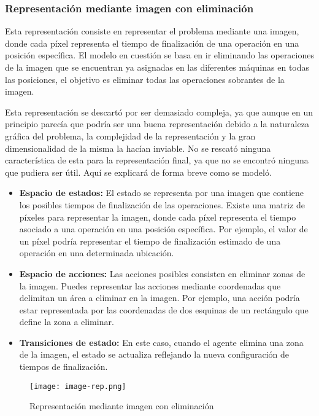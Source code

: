 \subsubsection{Representación mediante imagen con eliminación}
Esta representación consiste en representar el problema mediante una imagen, donde
cada píxel representa el tiempo de finalización de una operación en una posición
específica. El modelo en cuestión se basa en ir eliminando las operaciones de la
imagen que se encuentran ya asignadas en las diferentes máquinas en todas las
posiciones, el objetivo es eliminar todas las operaciones sobrantes de la 
imagen.\medskip

Esta representación se descartó por ser demasiado compleja, ya que aunque
en un principio parecía que podría ser una buena representación debido a la naturaleza
gráfica del problema, la complejidad de la representación y la gran dimensionalidad de
la misma la hacían inviable. No se rescató ninguna característica de esta para la 
representación final, ya que no se encontró ninguna que pudiera ser útil. Aquí se
explicará de forma breve como se modeló.

\begin{itemize}
    \item \textbf{Espacio de estados:} El estado se representa por una imagen que contiene 
    los posibles tiempos de finalización de las operaciones. Existe una matriz de píxeles 
    para representar la imagen, donde cada píxel representa el tiempo asociado a una operación 
    en una posición específica. Por ejemplo, el valor de un píxel podría representar el tiempo 
    de finalización estimado de una operación en una determinada ubicación.
    \item \textbf{Espacio de acciones:} Las acciones posibles consisten en eliminar zonas de 
    la imagen. Puedes representar las acciones mediante coordenadas que delimitan un área a 
    eliminar en la imagen. Por ejemplo, una acción podría estar representada por las 
    coordenadas de dos esquinas de un rectángulo que define la zona a eliminar.
    \item \textbf{Transiciones de estado:} En este caso, cuando el agente elimina una zona de 
    la imagen, el estado se actualiza reflejando la nueva configuración de tiempos de finalización. 
\end{itemize}
\begin{figure}[ht]
    \centering
    \texttt{[image: image-rep.png]}
    \caption{Representación mediante imagen con eliminación}
    \label{fig:image-rep}
\end{figure}

